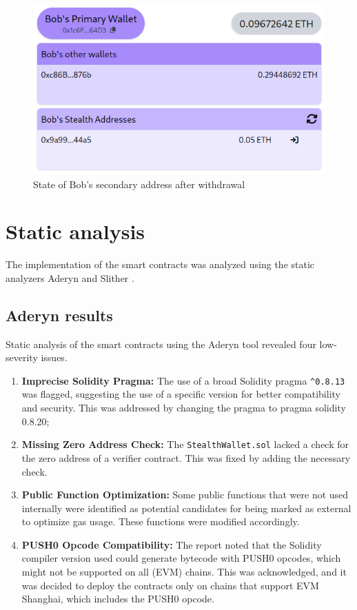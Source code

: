 \begin{figure}[h!]
    \centering
    \includegraphics[width=\textwidth]{assets/images/demo/after-withdrawal.png}
    \caption{State of Bob's secondary address after withdrawal}
    \label{fig:after-withdrawal}
\end{figure}

\section{Static analysis}

The implementation of the smart contracts was analyzed using the static analyzers
Aderyn \cite{githubCyfrinaderyn} and Slither \cite{githubCryticslither}.

\subsection{Aderyn results}

Static analysis of the smart contracts using the Aderyn tool revealed four low-severity issues.

\begin{enumerate}
    \item \textbf{Imprecise Solidity Pragma:} The use of a broad Solidity
        pragma \texttt{\textasciicircum0.8.13} was flagged, suggesting the use of a specific version for
        better compatibility and security. This was addressed by changing the
        pragma to pragma solidity 0.8.20;
    \item \textbf{Missing Zero Address Check:} The \texttt{StealthWallet.sol}
        lacked a check for the zero address of a verifier contract. This was
        fixed by adding the necessary check.
    \item \textbf{Public Function Optimization:} Some public functions that
        were not used internally were identified as potential candidates for being
        marked as external to optimize gas usage. These functions were modified
        accordingly.
    \item \textbf{PUSH0 Opcode Compatibility:} The report noted that the
        Solidity compiler version used could generate bytecode with PUSH0 opcodes,
        which might not be supported on all (EVM) chains.
        This was acknowledged, and it was decided to deploy the contracts only on
        chains that support EVM Shanghai, which includes the PUSH0 opcode.
\end{enumerate}


